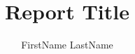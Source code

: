 \documentclass[journal,onecolumn]{IEEEtran}	%
\begin{document}
\title{Report Title}			%
\author{FirstName LastName}		%
\maketitle				%








\end{document}
